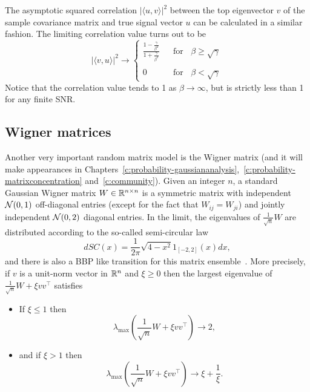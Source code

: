 The asymptotic squared correlation $|\langle u, v\rangle |^2$ between the top eigenvector $v$ of the sample covariance matrix and true signal vector $u$ can be calculated in a similar fashion. The limiting correlation value turns out to be
\begin{equation}
\label{eq:SVD:corr}
|\langle v, u \rangle|^2 \to \left\{\begin{array}{ccc}
                                      \frac{1-\frac{\gamma}{\beta^2}}{1+\frac{\gamma}{\beta^2}} & & \text{for }\;\; \beta \geq \sqrt{\gamma} \\
                                       & & \\
                                      0 & & \text{for }\;\; \beta < \sqrt{\gamma}
                                    \end{array}
 \right.
\end{equation}
Notice that the correlation value tends to 1 as $\beta \to \infty$, but is strictly less than 1 for any finite SNR.



\subsection{Wigner matrices}\label{subsection:WignerMatrices}

Another very important random matrix model is the Wigner matrix (and it will make appearances in Chapters~\ref{c:probability-gaussiananalysis},~\ref{c:probability-matrixconcentration} and~\ref{c:community}). Given an integer $n$, a standard Gaussian Wigner matrix $W\in\mathbb{R}^{n\times n}$ is a symmetric matrix with independent $\mathcal{N}(0,1)$ off-diagonal entries (except for the fact that $W_{ij}=W_{ji}$) and jointly independent $\mathcal{N}(0,2)$ diagonal entries. In the limit, the eigenvalues of $\frac1{\sqrt{n}}W$ are distributed according to the so-called semi-circular law
\begin{equation}\label{eq:WignerSC}
 dSC(x) = \frac1{2\pi}\sqrt{4-x^2}1_{[-2,2]}(x)dx,
\end{equation}
and there is also a BBP like transition for this matrix ensemble~\cite{Feral_Peche_BPPWigner}. More precisely, if $v$ is a unit-norm vector in $\mathbb{R}^n$ and $\xi\geq 0$ then the largest eigenvalue of $\frac1{\sqrt{n}}W+\xi vv^\top  $ satisfies

\begin{itemize}
 \item If $\xi \leq 1$ then
 \[
  \lambda_{\max}\left(\frac1{\sqrt{n}}W+\xi vv^\top   \right) \to 2,
 \]
 \item and if $\xi > 1$ then
 \begin{equation}\label{eq:1spike_Wigner:PCA1}
  \lambda_{\max}\left(\frac1{\sqrt{n}}W+\xi vv^\top   \right) \to \xi + \frac1{\xi}.
 \end{equation}
\end{itemize}

